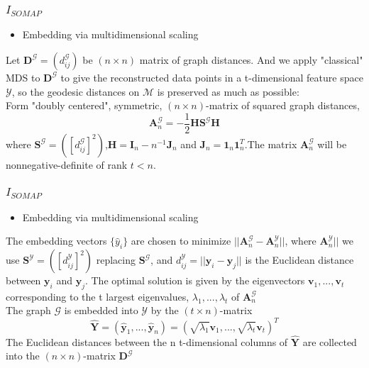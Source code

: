 \documentclass{beamer}
\begin{document}
\begin{frame}
\frametitle{$I_{SOMAP}$}
\begin{itemize}
  \item Embedding via multidimensional scaling
\end{itemize}
Let $\textbf{D}^{\mathcal{G}}=(d_{ij}^{\mathcal{G}})$ be $(n \times n)$ matrix of graph distances. And we apply "classical" MDS to $\textbf{D}^{\mathcal{G}}$ to give the reconstructed data points in a t-dimensional feature space $\mathcal{Y}$, so the geodesic distances on $\mathcal{M}$ is preserved as much as possible:\\
Form "doubly centered", symmetric, $(n \times n)$-matrix of squared graph distances,
\[\textbf{A}_n^{\mathcal{G}}=-\frac{1}{2}\textbf{H}\textbf{S}^{\mathcal{G}}\textbf{H}\]
where $\textbf{S}^{\mathcal{G}}=([d_{ij}^{\mathcal{G}}]^2)$,$\textbf{H}=\textbf{I}_n-n^{-1}\textbf{J}_n$ and $\textbf{J}_n=\textbf{1}_n\textbf{1}_{n}^T$.The matrix $\textbf{A}_n^{\mathcal{G}}$ will be nonnegative-definite of rank $t<n$.
\end{frame}

\begin{frame}
\frametitle{$I_{SOMAP}$}
\begin{itemize}
  \item Embedding via multidimensional scaling
\end{itemize}
The embedding vectors $\{\hat{y}_i\}$ are chosen to minimize $||\textbf{A}_n^{\mathcal{G}}-\textbf{A}_n^{\mathcal{Y}}||$, where $\textbf{A}_n^{\mathcal{Y}}||$ we use $\textbf{S}^{\mathcal{Y}}=([d_{ij}^{\mathcal{Y}}]^2)$ replacing $\textbf{S}^{\mathcal{G}}$, and $d_{ij}^{\mathcal{Y}}=||\textbf{y}_i-\textbf{y}_j||$ is the Euclidean distance between $\textbf{y}_i$ and $\textbf{y}_j$. The optimal solution is given by the eigenvectors $\textbf{v}_1,...,\textbf{v}_t$ corresponding to the t largest eigenvalues,  $\lambda_1,...,\lambda_t$ of  $\textbf{A}_n^{\mathcal{G}}$\\
The graph $\mathcal{G}$ is embedded into $\mathcal{Y}$ by the $(t \times n)$-matrix 
\[ \hat{\textbf{Y}}=(\hat{\textbf{y}}_1,...,\hat{\textbf{y}}_n)=(\sqrt{\lambda_1}\textbf{v}_1,...,\sqrt{\lambda_t}\textbf{v}_t)^T\]
The Euclidean distances between the n t-dimensional columns of $\hat{\textbf{Y}}$ are collected into the $(n \times n)$-matrix $\textbf{D}^{\mathcal{G}}$
\end{frame}
\end{document}
